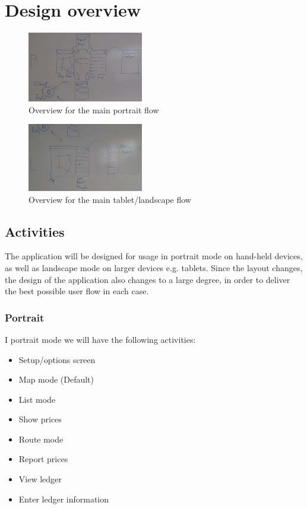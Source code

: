 
\chapter{Design overview}

\begin{figure}[!htb]
	\centering
	\includegraphics[width=0.45\textwidth]{P.jpg}
	\caption{Overview for the main portrait flow}
	\label{fig:p}
\end{figure}

\begin{figure}[!htb]
	\centering
	\includegraphics[width=0.45\textwidth]{L.jpg}
	\caption{Overview for the main tablet/landscape flow}
	\label{fig:l}
\end{figure}

\section{Activities}
The application will be designed for usage in portrait mode on hand-held devices, as well as landscape mode on larger devices e.g. tablets. Since the layout changes, the design of the application also changes to a large degree, in order to deliver the best possible user flow in each case.

\subsection{Portrait}
I portrait mode we will have the following activities:
\begin{itemize}
	\item Setup/options screen
	\item Map mode (Default)
	\item List mode
	\item Show prices
	\item Route mode
	\item Report prices
	\item View ledger
	\item Enter ledger information
\end{itemize}

